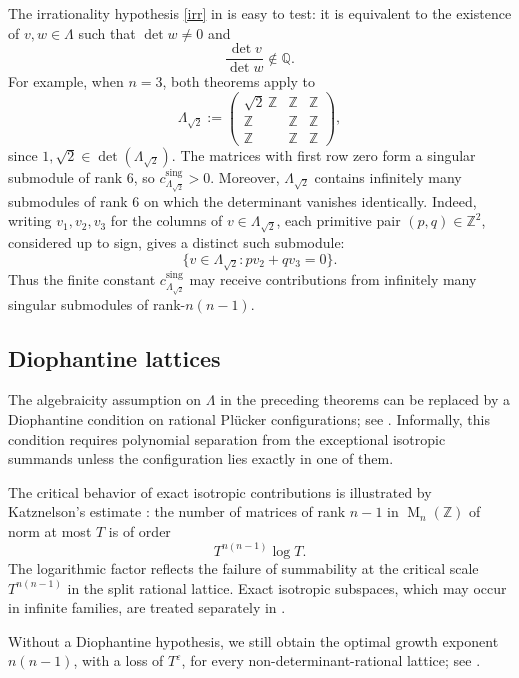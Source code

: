 \documentclass[reqno,11pt]{amsart}
\numberwithin{equation}{section}
\theoremstyle{definition}
\theoremstyle{remark}
\newcommand{\op}{\operatorname}
\newcommand{\M}{\op{M}}
\begin{document}
The irrationality hypothesis \eqref{irr} in  is easy to test: it is
equivalent to the existence of $v,w\in\Lambda$ such that $\det w\ne0$ and
$$
\frac{\det v}{\det w}\notin\mathbb Q.
$$
For example, when $n=3$, both theorems apply to
\begin{equation}\label{ex1}
\Lambda_{\sqrt2}
:=
\begin{pmatrix}
\sqrt2\,\mathbb Z&\mathbb Z&\mathbb Z\\
\mathbb Z&\mathbb Z&\mathbb Z\\
\mathbb Z&\mathbb Z&\mathbb Z
\end{pmatrix},
\end{equation}
since $1,\sqrt2\in\det(\Lambda_{\sqrt2})$. The matrices with first row zero
form a singular submodule of rank $6$, so
$c_{\Lambda_{\sqrt2}}^{\operatorname{sing}}>0$.
Moreover, $\Lambda_{\sqrt2}$ contains infinitely many submodules of rank $6$
on which the determinant vanishes identically. Indeed, writing
$v_1,v_2,v_3$ for the columns of $v\in\Lambda_{\sqrt2}$, each primitive
pair $(p,q)\in\mathbb Z^2$, considered up to sign, gives a distinct such
submodule:
$$
\{v\in\Lambda_{\sqrt2}:pv_2+qv_3=0\}.
$$
Thus the finite constant $c_{\Lambda_{\sqrt2}}^{\operatorname{sing}}$
may receive contributions
from infinitely many singular submodules of rank-$n(n-1)$.


\subsection{Diophantine lattices} The algebraicity assumption on $\Lambda$ in the preceding theorems can be
replaced by a Diophantine condition on rational Pl\"ucker configurations;
see . Informally, this condition requires
polynomial separation from the exceptional isotropic summands unless the
configuration lies exactly in one of them.

The critical behavior of exact isotropic contributions is illustrated by
Katznelson's estimate \cite{katznelson:1994}: the number of 
matrices of rank $n-1$ in $\M_n(\mathbb Z)$ of norm at most $T$ is of order
$$
T^{n(n-1)}\log T.
$$
The logarithmic factor reflects the failure of summability at the critical scale
$T^{n(n-1)}$ in the split rational lattice. Exact isotropic
subspaces, which may occur in infinite families, are treated separately in
.


Without a Diophantine hypothesis, we still obtain the optimal growth
exponent $n(n-1)$, with a loss of $T^\varepsilon$, for every
non-determinant-rational lattice; see
.
\end{document}
